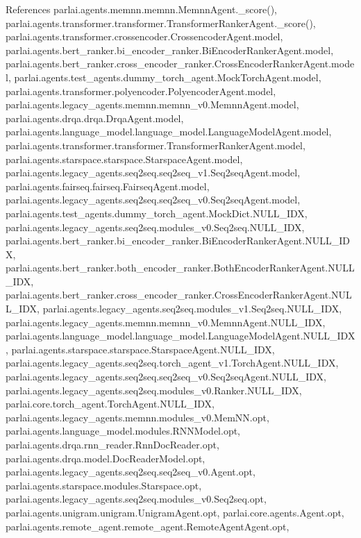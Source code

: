 References parlai.\+agents.\+memnn.\+memnn.\+Memnn\+Agent.\+\_\+score(), parlai.\+agents.\+transformer.\+transformer.\+Transformer\+Ranker\+Agent.\+\_\+score(), parlai.\+agents.\+transformer.\+crossencoder.\+Crossencoder\+Agent.\+model, parlai.\+agents.\+bert\+\_\+ranker.\+bi\+\_\+encoder\+\_\+ranker.\+Bi\+Encoder\+Ranker\+Agent.\+model, parlai.\+agents.\+bert\+\_\+ranker.\+cross\+\_\+encoder\+\_\+ranker.\+Cross\+Encoder\+Ranker\+Agent.\+model, parlai.\+agents.\+test\+\_\+agents.\+dummy\+\_\+torch\+\_\+agent.\+Mock\+Torch\+Agent.\+model, parlai.\+agents.\+transformer.\+polyencoder.\+Polyencoder\+Agent.\+model, parlai.\+agents.\+legacy\+\_\+agents.\+memnn.\+memnn\+\_\+v0.\+Memnn\+Agent.\+model, parlai.\+agents.\+drqa.\+drqa.\+Drqa\+Agent.\+model, parlai.\+agents.\+language\+\_\+model.\+language\+\_\+model.\+Language\+Model\+Agent.\+model, parlai.\+agents.\+transformer.\+transformer.\+Transformer\+Ranker\+Agent.\+model, parlai.\+agents.\+starspace.\+starspace.\+Starspace\+Agent.\+model, parlai.\+agents.\+legacy\+\_\+agents.\+seq2seq.\+seq2seq\+\_\+v1.\+Seq2seq\+Agent.\+model, parlai.\+agents.\+fairseq.\+fairseq.\+Fairseq\+Agent.\+model, parlai.\+agents.\+legacy\+\_\+agents.\+seq2seq.\+seq2seq\+\_\+v0.\+Seq2seq\+Agent.\+model, parlai.\+agents.\+test\+\_\+agents.\+dummy\+\_\+torch\+\_\+agent.\+Mock\+Dict.\+N\+U\+L\+L\+\_\+\+I\+DX, parlai.\+agents.\+legacy\+\_\+agents.\+seq2seq.\+modules\+\_\+v0.\+Seq2seq.\+N\+U\+L\+L\+\_\+\+I\+DX, parlai.\+agents.\+bert\+\_\+ranker.\+bi\+\_\+encoder\+\_\+ranker.\+Bi\+Encoder\+Ranker\+Agent.\+N\+U\+L\+L\+\_\+\+I\+DX, parlai.\+agents.\+bert\+\_\+ranker.\+both\+\_\+encoder\+\_\+ranker.\+Both\+Encoder\+Ranker\+Agent.\+N\+U\+L\+L\+\_\+\+I\+DX, parlai.\+agents.\+bert\+\_\+ranker.\+cross\+\_\+encoder\+\_\+ranker.\+Cross\+Encoder\+Ranker\+Agent.\+N\+U\+L\+L\+\_\+\+I\+DX, parlai.\+agents.\+legacy\+\_\+agents.\+seq2seq.\+modules\+\_\+v1.\+Seq2seq.\+N\+U\+L\+L\+\_\+\+I\+DX, parlai.\+agents.\+legacy\+\_\+agents.\+memnn.\+memnn\+\_\+v0.\+Memnn\+Agent.\+N\+U\+L\+L\+\_\+\+I\+DX, parlai.\+agents.\+language\+\_\+model.\+language\+\_\+model.\+Language\+Model\+Agent.\+N\+U\+L\+L\+\_\+\+I\+DX, parlai.\+agents.\+starspace.\+starspace.\+Starspace\+Agent.\+N\+U\+L\+L\+\_\+\+I\+DX, parlai.\+agents.\+legacy\+\_\+agents.\+seq2seq.\+torch\+\_\+agent\+\_\+v1.\+Torch\+Agent.\+N\+U\+L\+L\+\_\+\+I\+DX, parlai.\+agents.\+legacy\+\_\+agents.\+seq2seq.\+seq2seq\+\_\+v0.\+Seq2seq\+Agent.\+N\+U\+L\+L\+\_\+\+I\+DX, parlai.\+agents.\+legacy\+\_\+agents.\+seq2seq.\+modules\+\_\+v0.\+Ranker.\+N\+U\+L\+L\+\_\+\+I\+DX, parlai.\+core.\+torch\+\_\+agent.\+Torch\+Agent.\+N\+U\+L\+L\+\_\+\+I\+DX, parlai.\+agents.\+legacy\+\_\+agents.\+memnn.\+modules\+\_\+v0.\+Mem\+N\+N.\+opt, parlai.\+agents.\+language\+\_\+model.\+modules.\+R\+N\+N\+Model.\+opt, parlai.\+agents.\+drqa.\+rnn\+\_\+reader.\+Rnn\+Doc\+Reader.\+opt, parlai.\+agents.\+drqa.\+model.\+Doc\+Reader\+Model.\+opt, parlai.\+agents.\+legacy\+\_\+agents.\+seq2seq.\+seq2seq\+\_\+v0.\+Agent.\+opt, parlai.\+agents.\+starspace.\+modules.\+Starspace.\+opt, parlai.\+agents.\+legacy\+\_\+agents.\+seq2seq.\+modules\+\_\+v0.\+Seq2seq.\+opt, parlai.\+agents.\+unigram.\+unigram.\+Unigram\+Agent.\+opt, parlai.\+core.\+agents.\+Agent.\+opt, parlai.\+agents.\+remote\+\_\+agent.\+remote\+\_\+agent.\+Remote\+Agent\+Agent.\+opt, 
